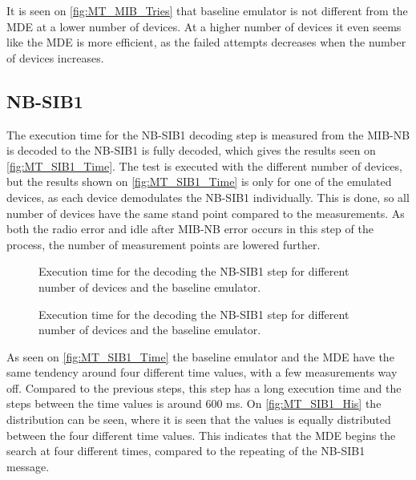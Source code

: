 It is seen on \autoref{fig:MT_MIB_Tries} that baseline emulator is not different from the MDE at a lower number of devices. At a higher number of devices it even seems like the MDE is more efficient, as the failed attempts decreases when the number of devices increases.

\subsection{NB-SIB1}
The execution time for the NB-SIB1 decoding step is measured from the MIB-NB is decoded to the NB-SIB1 is fully decoded, which gives the results seen on \autoref{fig:MT_SIB1_Time}. The test is executed with the different number of devices, but the results shown on \autoref{fig:MT_SIB1_Time} is only for one of the emulated devices, as each device demodulates the NB-SIB1 individually. This is done, so all number of devices have the same stand point compared to the measurements.
As both the radio error and idle after MIB-NB error occurs in this step of the process, the number of measurement points are lowered further.

\captionsetup{belowskip=0em}
\begin{minipage}{0.48\textwidth}
\begin{figure}[H]
\centering
\resizebox{\textwidth}{!}{
}
\caption{Execution time for the decoding the NB-SIB1 step for different number of devices and the baseline emulator.}
\label{fig:MT_SIB1_Time}
\end{figure}
\end{minipage}%
\hfill
\begin{minipage}{0.48\textwidth}
\begin{figure}[H]
\centering
\resizebox{\textwidth}{!}{
}
\caption{Execution time for the decoding the NB-SIB1 step for different number of devices and the baseline emulator.}
\label{fig:MT_SIB1_His}
\end{figure}
\end{minipage}
\captionsetup{belowskip=-1.5em}

As seen on \autoref{fig:MT_SIB1_Time} the baseline emulator and the MDE have the same tendency around four different time values, with a few measurements way off. Compared to the previous steps, this step has a long execution time and the steps between the time values is around 600 ms. On \autoref{fig:MT_SIB1_His}  the distribution can be seen, where it is seen that the values is equally distributed between the four different time values. This indicates that the MDE begins the search at four different times, compared to the repeating of the NB-SIB1 message.


